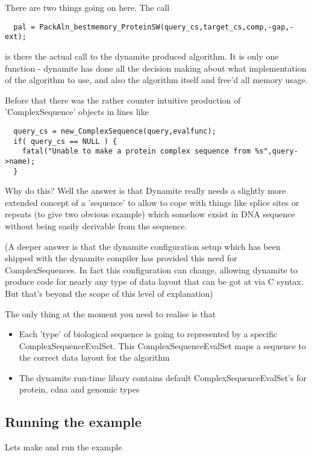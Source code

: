 There are two things going on here. The call 

\begin{verbatim}
  pal = PackAln_bestmemory_ProteinSW(query_cs,target_cs,comp,-gap,-ext);
\end{verbatim}

is there the actual call to the dynamite produced algorithm. It is only
one function - dynamite has done all the decision making about what 
implementation of the algorithm to use, and also the algorithm itself and
free'd all memory usage.

Before that there was the rather counter intuitive production of 'ComplexSequence'
objects in lines like

\begin{verbatim}
  query_cs = new_ComplexSequence(query,evalfunc);
  if( query_cs == NULL ) {
    fatal("Unable to make a protein complex sequence from %s",query->name);
  }
\end{verbatim}

Why do this? Well the answer is that Dynamite really needs a slightly more
extended concept of a 'sequence' to allow to cope with things like splice
sites or repeats (to give two obvious example) which somehow exsist in DNA
sequence without being easily derivable from the sequence.

(A deeper answer is that the dynamite configuration setup which has been shipped
with the dynamite compiler has provided this need for ComplexSequences. In fact
this configuration can change, allowing dynamite to produce code for nearly any
type of data layout that can be got at via C syntax. But that's beyond the scope
of this level of explanation)

The only thing at the moment you need to realise is that 

\begin{itemize}
\item Each 'type' of biological sequence is going to represented by
a specific ComplexSequenceEvalSet. This ComplexSequenceEvalSet
maps a sequence to the correct data layout for the algorithm
\item The dynamite run-time libary contains default ComplexSequenceEvalSet's
for protein, cdna and genomic types
\end{itemize}


\subsection{Running the example}
Lets make and run the example

